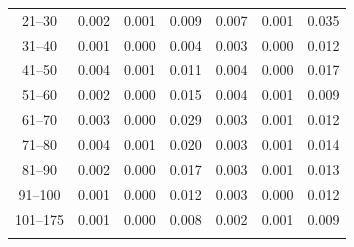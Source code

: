 \begin{table}
\begin{tabular}{ccccccc}
21--30 & 0.002 & 0.001 & 0.009 & 0.007 & 0.001 & 0.035\\
31--40 & 0.001 & 0.000 & 0.004 & 0.003 & 0.000 & 0.012\\
41--50 & 0.004 & 0.001 & 0.011 & 0.004 & 0.000 & 0.017\\
51--60 & 0.002 & 0.000 & 0.015 & 0.004 & 0.001 & 0.009\\
61--70 & 0.003 & 0.000 & 0.029 & 0.003 & 0.001 & 0.012\\
71--80 & 0.004 & 0.001 & 0.020 & 0.003 & 0.001 & 0.014\\
81--90 & 0.002 & 0.000 & 0.017 & 0.003 & 0.001 & 0.013\\
91--100 & 0.001 & 0.000 & 0.012 & 0.003 & 0.000 & 0.012\\
101--175 & 0.001 &  0.000 & 0.008 & 0.002 &  0.001 & 0.009\\
\noalign{\smallskip}\hline
\end{tabular}
\end{table}


